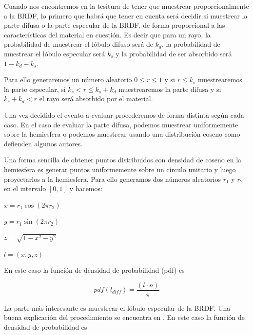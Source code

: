 \medskip
Cuando nos encontremos en la tesitura de tener que muestrear proporcionalmente a la BRDF, lo primero que habrá que tener en cuenta será decidir si  muestrear la parte difusa o la parte especular de la BRDF, de forma proporcional a las características del material en cuestión. Es decir que para un rayo, la probabilidad de muestrear el lóbulo difuso será de $k_d$, la probabilidad de muestrear el lóbulo especular será $k_s$ y la probabilidad de ser absorbido será $1 - k_d - k_s$.

\medskip

Para ello generaremos un número aleatorio $0 \leq r \leq 1$ y si
$r \leq k_s$ muestrearemos la parte especular,
si  $k_s < r \leq k_s + k_d$ muestrearemos la parte difusa
y si  $k_s + k_d < r$ el rayo será absorbido por el material.

\medskip

Una vez decidido el evento a evaluar procederemos de forma distinta según cada caso. En el caso de evaluar la parte difusa, podemos muestrear uniformemente sobre la hemiesfera o podemos muestrear usando una distribución coseno como defienden algunos autores.

\clearpage

Una forma sencilla de obtener puntos distribuidos con densidad de coseno en la hemiesfera es generar puntos uniformemente sobre un círculo unitario y luego proyectarlos a la hemiesfera.
Para ello generamos dos números aleatorios $r_1$ y $r_2$ en el intervalo $[0, 1]$ y hacemos:

\smallskip

$x = r_1 \cos (2\pi r_2)$

\smallskip

$y = r_1 \sin (2\pi r_2)$

\smallskip

$z = \sqrt{1 - x^2 - y^2}$

\smallskip

$l = (x, y, z)$

\medskip

En este caso la función de densidad de probabilidad (pdf) es

\smallskip

\begin{equation}
pdf(l_{diff}) = \frac{(l \cdot n)}{\pi}
\end{equation}

La parte más interesante es muestrear el lóbulo especular de la BRDF. Una buena explicación del procedimiento se encuentra en \cite{Lafortune1994}. En este caso la función de densidad de probabilidad es

